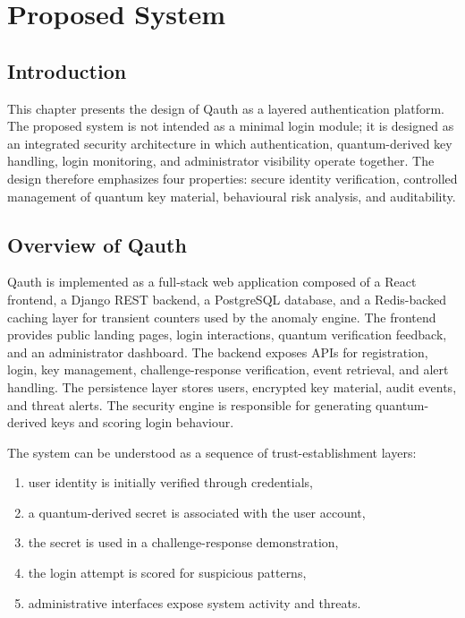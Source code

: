 \chapter{Proposed System}

\section{Introduction}
This chapter presents the design of Qauth as a layered authentication platform. The proposed system is not intended as a minimal login module; it is designed as an integrated security architecture in which authentication, quantum-derived key handling, login monitoring, and administrator visibility operate together. The design therefore emphasizes four properties: secure identity verification, controlled management of quantum key material, behavioural risk analysis, and auditability.

\section{Overview of Qauth}
Qauth is implemented as a full-stack web application composed of a React frontend, a Django REST backend, a PostgreSQL database, and a Redis-backed caching layer for transient counters used by the anomaly engine. The frontend provides public landing pages, login interactions, quantum verification feedback, and an administrator dashboard. The backend exposes APIs for registration, login, key management, challenge-response verification, event retrieval, and alert handling. The persistence layer stores users, encrypted key material, audit events, and threat alerts. The security engine is responsible for generating quantum-derived keys and scoring login behaviour.

The system can be understood as a sequence of trust-establishment layers:

\begin{enumerate}
    \item user identity is initially verified through credentials,
    \item a quantum-derived secret is associated with the user account,
    \item the secret is used in a challenge-response demonstration,
    \item the login attempt is scored for suspicious patterns,
    \item administrative interfaces expose system activity and threats.
\end{enumerate}

